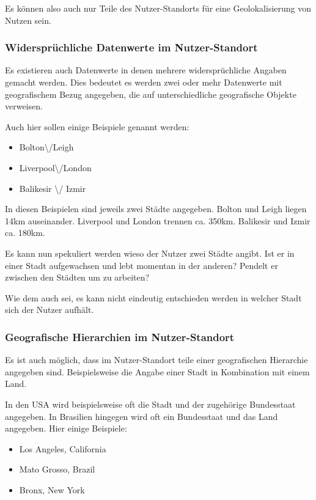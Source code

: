 				Es können also auch nur Teile des Nutzer-Standorts für eine Geolokalisierung von Nutzen sein.

			\subsubsection*{Widersprüchliche Datenwerte im Nutzer-Standort} \label{subsec:wiederspruechlicheBezuege} 

				Es existieren auch Datenwerte in denen mehrere widersprüchliche Angaben gemacht werden.
				Dies bedeutet es werden zwei oder mehr Datenwerte mit geografischem Bezug angegeben, die auf unterschiedliche geografische Objekte verweisen.

				Auch hier sollen einige Beispiele genannt werden:

				\begin{itemize}
					\item Bolton\textbackslash/Leigh
					\item Liverpool\textbackslash/London
					\item  Balikesir \textbackslash/ Izmir	
				\end{itemize}							
					
				In diesen Beispielen sind jeweils zwei Städte angegeben.
				Bolton und Leigh liegen 14km auseinander.
				Liverpool und London trennen ca. 350km.
				Balikesir und Izmir ca. 180km.

				Es kann nun spekuliert werden wieso der Nutzer zwei Städte angibt.
				Ist er in einer Stadt aufgewachsen und lebt momentan in der anderen?
				Pendelt er zwischen den Städten um zu arbeiten?

				Wie dem auch sei, es kann nicht eindeutig entschieden werden in welcher Stadt sich der Nutzer aufhält.

			\subsubsection*{Geografische Hierarchien im Nutzer-Standort}

				Es ist auch möglich, dass im Nutzer-Standort teile einer geografischen Hierarchie angegeben sind.
				Beispielsweise die Angabe einer Stadt in Kombination mit einem Land.
				
				In den USA wird beispielsweise oft die Stadt und der zugehörige Bundesstaat angegeben.
				In Brasilien hingegen wird oft ein Bundesstaat und das Land angegeben.
				Hier einige Beispiele:

				\begin{itemize}
					\item Los Angeles, California
					\item Mato Grosso, Brazil
					\item Bronx, New York	
				\end{itemize}		

